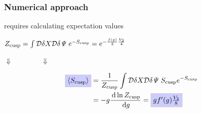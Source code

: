 \documentclass{beamer}
\begin{document}

\begin{frame}
\frametitle{Numerical approach}

requires calculating expectation values\vspace{2mm}
{
\begin{tcolorbox}[colback=white!95!black, colframe=white!90!black]
\begin{center}
$Z_{\rm cusp} = \int \mathcal{D}\delta X\mathcal{D}\delta \mathit{\Psi} \; e^{-S_{\rm cusp}} = e^{-\frac{f(g)}{2}\frac{V_{2}}{4}}$
\end{center}
\end{tcolorbox} %
\begin{center}
$\Downarrow \qquad \qquad \Downarrow$
\end{center}
\begin{tcolorbox}[colback=white!95!black, colframe=white!90!black]
\begin{align*}
\fcolorbox{white!70!black}{white!80!blue}{$\langle S_{\rm cusp} \rangle $} &= \frac{1}{Z_{\rm cusp}} \int \mathcal{D}\delta X\mathcal{D}\delta \mathit{\Psi} \; S_{\rm cusp} e^{-S_{\rm cusp}} \\
&= -g \frac{\dd \ln Z_{\rm cusp}}{\dd g} = \fcolorbox{white!70!black}{white!80!blue}{$g f'(g) \frac{V_{2}}{8}$}
\end{align*}
\end{tcolorbox}
}
\end{frame}

\end{document}
